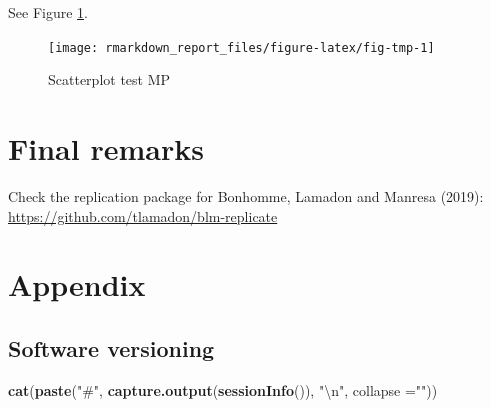 \documentclass[
  12pt,
]{article}
\newenvironment{Shaded}{\begin{snugshade}}{\end{snugshade}}
\newcommand{\CharTok}[1]{\textcolor[rgb]{0.31,0.60,0.02}{#1}}
\newcommand{\DataTypeTok}[1]{\textcolor[rgb]{0.13,0.29,0.53}{#1}}
\newcommand{\KeywordTok}[1]{\textcolor[rgb]{0.13,0.29,0.53}{\textbf{#1}}}
\newcommand{\NormalTok}[1]{#1}
\newcommand{\StringTok}[1]{\textcolor[rgb]{0.31,0.60,0.02}{#1}}
\begin{document}
See Figure \ref{fig:fig-tmp}.

\begin{figure}[ht]

{\centering \texttt{[image: rmarkdown\_report\_files/figure-latex/fig-tmp-1]} 

}

\caption{Scatterplot test MP}\label{fig:fig-tmp}
\end{figure}

\hypertarget{final-remarks}{%
\section{Final remarks}\label{final-remarks}}

Check the replication package for Bonhomme, Lamadon and Manresa (2019): \url{https://github.com/tlamadon/blm-replicate}

\newpage

\hypertarget{appendix}{%
\section{Appendix}\label{appendix}}

\hypertarget{software-versioning}{%
\subsection{Software versioning}\label{software-versioning}}

\begin{Shaded}
\begin{Highlighting}[]
\KeywordTok{cat}\NormalTok{(}\KeywordTok{paste}\NormalTok{(}\StringTok{"#"}\NormalTok{, }\KeywordTok{capture.output}\NormalTok{(}\KeywordTok{sessionInfo}\NormalTok{()), }\StringTok{"}\CharTok{\textbackslash{}n}\StringTok{"}\NormalTok{, }\DataTypeTok{collapse =}\StringTok{""}\NormalTok{))}
\end{Highlighting}
\end{Shaded}
\end{document}
